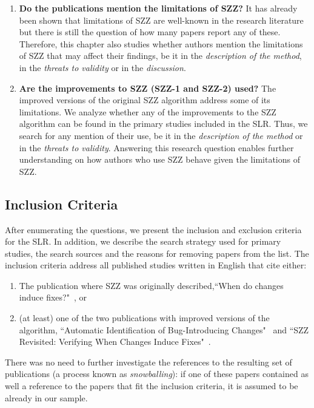 \documentclass[a4paper, 12pt]{book}
\begin{document}
\begin{enumerate}
	\item \textbf{Do the publications mention the limitations of SZZ?} It has already been shown that limitations of SZZ are well-known in the research literature but there is still the question of how many papers report any of these. Therefore, this chapter also studies whether authors mention the limitations of SZZ that may affect their findings, be it in the \emph{description of the method}, in the \emph{threats to validity} or in the \emph{discussion}.
	\item \textbf{Are the improvements to SZZ (SZZ-1 and SZZ-2) used?} The improved versions of the original SZZ algorithm address some of its limitations. We analyze whether any of the improvements to the SZZ algorithm can be found in the primary studies included in the SLR. Thus, we search for any mention of their use, be it in the \emph{description of the method} or in the \emph{threats to validity}. Answering this research question enables further understanding on how authors who use SZZ behave given the limitations of SZZ.

\end{enumerate}

\subsection{Inclusion Criteria}
\label{subsec:Inclusion}
After enumerating the questions, we present the inclusion and exclusion criteria for the SLR. In addition, we describe the search strategy used for primary studies, the search sources and the reasons for removing papers from the list.
The inclusion criteria address all published studies written in English that cite either:
\begin{enumerate}
  \item The publication where SZZ was originally described,``When do changes induce fixes?"~\cite{sliwerski2005changes}, or
  \item (at least) one of the two publications with improved versions of the algorithm, ``Automatic Identification of Bug-Introducing Changes"~\cite{kim2006automatic} and ``SZZ Revisited: Verifying When Changes Induce Fixes"~\cite{williams2008szz}.  \end{enumerate}
 
There was no need to further investigate the references to the resulting set of publications (a process known as \emph{snowballing}): if one of these papers contained as well a reference to the papers that fit the inclusion criteria, it is assumed to be already in our sample. 
\end{document}
